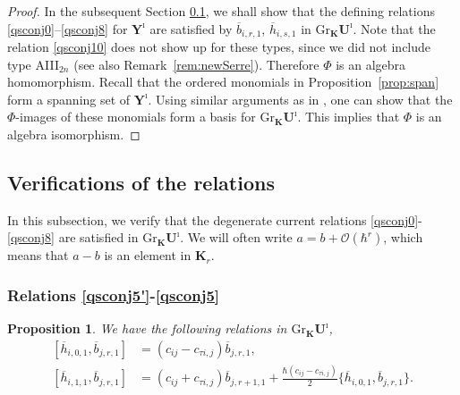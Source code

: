 \documentclass[11pt,reqno]{amsart}
\numberwithin{equation}{section}
\newtheorem{prop}[thm]{Proposition}
\theoremstyle{definition}
\theoremstyle{remark}
\newcommand{\bK}{\mathbb{K}}
\newcommand{\mc}{\mathcal}
\newcommand{\Yi}{{\mathbf{Y}^\imath}}
\def \h{\hbar}
\def \H{h}
\def \X{b}
\def \Gr{\mathrm{Gr}}
\def \tUi{\mathbf{U}^\imath}
\def \bK{\mathbf{K}}
\def \ov{\overline}
\begin{document}
\begin{proof}
In the subsequent Section \ref{sec:qsdegen}, we shall show that the defining relations \eqref{qsconj0}--\eqref{qsconj8} for $\Yi$ are satisfied by $\ov{\X}_{i,r,1}$, $\ov{\H}_{i,s,1}$ in $\Gr_{\bK}\tUi$. Note that the relation \eqref{qsconj10} does not show up for these types, since we did not include type AIII$_{2n}$ (see also Remark~\ref{rem:newSerre}). Therefore $\Phi$ is an algebra homomorphism. Recall that the ordered monomials in Proposition~\ref{prop:span} form a spanning set of $\Yi$. Using similar arguments as in \cite[Thm. 4.10]{KLWZ23b}, one can show that the $\Phi$-images of these monomials form a basis for $\Gr_{\bK}\tUi$. This implies that $\Phi$ is an algebra isomorphism. 
\end{proof}


\subsection{Verifications of the relations}\label{sec:qsdegen}
In this subsection, we verify that the degenerate current relations \eqref{qsconj0}-\eqref{qsconj8} are satisfied in $\Gr_{\mathbf{K}}\tUi$. We will often write $a=b+\mc O(\h^r)$, which means that $a-b$ is an element in $\bK_{r}$. 

\subsubsection{Relations \eqref{qsconj5'}-\eqref{qsconj5}}
 \begin{prop}
 We have the following relations in $\Gr_{\mathbf{K}}\tUi$, 
 \begin{align}
 \label{qssimple0}
[\ov{\H}_{i,0,1},\ov{\X}_{j,r,1}]&=(c_{ij}-c_{\tau i,j})\ov{\X}_{j,r,1},
\\\label{qssimple0'}
[\ov{\H}_{i,1,1},\ov{\X}_{j,r,1}]&=(c_{ij}+c_{\tau i,j}) \ov{\X}_{j,r+1,1}+\frac{\h(c_{ij}-c_{\tau i,j})}{2}\{\ov{\H}_{i,0,1},\ov{\X}_{j,r,1}\}.
\end{align}
 \end{prop}
\end{document}
